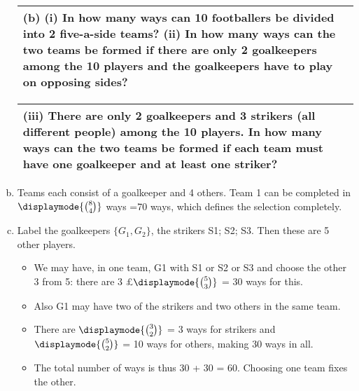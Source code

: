 \documentclass[a4paper,12pt]{article}
\begin{document}
\begin{enumerate}[(a)]
\newpage
  \begin{table}[ht!]
     \centering
     \begin{tabular}{|p{15cm}|}
     \hline  
(b) (i) In how many ways can 10 footballers be divided into 2 five-a-side teams?
(ii) In how many ways can the two teams be formed if there are only 2 goalkeepers among the 10 players and the goalkeepers have to play on opposing sides?

 \\ \hline 
      \end{tabular}
    \end{table}
  \begin{table}[ht!]
     \centering
     \begin{tabular}{|p{15cm}|}
     \hline  
(iii) There are only 2 goalkeepers and 3 strikers (all different people) among the 10 players.  In how many ways can the two teams be formed if each team must have one goalkeeper and at least one striker? \\ \hline
      \end{tabular}
    \end{table}
\item Teams each consist of a goalkeeper and 4 others. Team 1 can be completed
in $\displaymode{ {8 \choose 4}}$  ways =70 ways, which defines the selection completely.
\item  Label the goalkeepers $\{G_1,G_2\}$, the strikers S1; S2; S3. Then these are 5 other
players.


\begin{itemize}
    \item We may have, in one team, G1 with S1 or S2 or S3 and choose the other 3 from 5: there are 3 £$\displaymode{ {5 \choose 3}}$ = 30 ways for this. 
    \item  Also G1 may have two of the strikers and two others in the same team.
    \item There are $\displaymode{ {3 \choose 2}}$  = 3 ways for
strikers and$\displaymode{ {5 \choose 2}}$ = 10 ways for others, making 30 ways in all. 
    \item The total number of ways is thus 30 + 30 = 60. Choosing one team fixes the other.
\end{itemize}
\end{enumerate}
\end{document}
